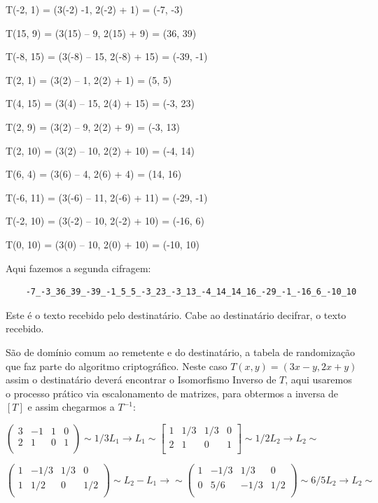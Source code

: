 \begin{center}
	T(-2, 1) = (3(-2) -1, 2(-2) + 1) = (-7, -3)
	
	T(15, 9) = (3(15) – 9, 2(15) + 9) = (36, 39)
	
	T(-8, 15) = (3(-8) – 15, 2(-8) + 15) = (-39, -1)
		
	T(2, 1)  = (3(2) – 1, 2(2) + 1) = (5, 5)
	
	T(4, 15)  = (3(4) – 15, 2(4) + 15) = (-3, 23)
	
	T(2, 9) = (3(2) – 9, 2(2) + 9) = (-3, 13)
	
	T(2, 10) = (3(2) – 10, 2(2) + 10) = (-4, 14)
	
	T(6, 4) = (3(6) – 4, 2(6) + 4) = (14, 16)
	
	T(-6, 11) = (3(-6) – 11, 2(-6) + 11) = (-29, -1)
	
	T(-2, 10) = (3(-2) – 10, 2(-2) + 10) = (-16, 6)
	
	T(0, 10) = (3(0) – 10, 2(0) + 10) = (-10, 10)
\end{center}

Aqui fazemos a segunda cifragem:

\begin{verbatim}
	-7_-3_36_39_-39_-1_5_5_-3_23_-3_13_-4_14_14_16_-29_-1_-16_6_-10_10
\end{verbatim}

Este é o texto recebido pelo destinatário. Cabe ao destinatário decifrar, o texto recebido.

São de domínio comum ao remetente e do destinatário, a tabela de
randomização que faz parte do algoritmo criptográfico. Neste caso $T(x, y) = (3x -y, 2x + y)$ assim o destinatário deverá encontrar
o Isomorfismo Inverso de $T$, aqui usaremos o processo prático via escalonamento de matrizes, para obtermos a inversa de $[T]$ e assim chegarmos a $T^{-1}$:

$
\begin{pmatrix}
	 3 & -1 & 1 & 0 \\
	 2 & 1 & 0 & 1 \\ 
	 \end{pmatrix}
	 \sim 1/3 L_1 \rightarrow L_1 \sim
\begin{bmatrix}
	1 & 1/3 & 1/3 & 0 \\
	2 & 1 & 0 & 1 \\
\end{bmatrix}
	\sim 1/2 L_2 \rightarrow L_2 \sim
$

$
\begin{pmatrix}
	1 & -1/3 & 1/3 & 0 \\
	1 & 1/2 & 0 & 1/2 \\
\end{pmatrix}
	\sim L_2 - L_1 \rightarrow \sim
\begin{pmatrix}
	1 & -1/3 & 1/3 & 0 \\
	0 & 5/6 & -1/3 & 1/2 \\
\end{pmatrix}
	\sim 6/5 L_2 \rightarrow L_2 \sim
$


